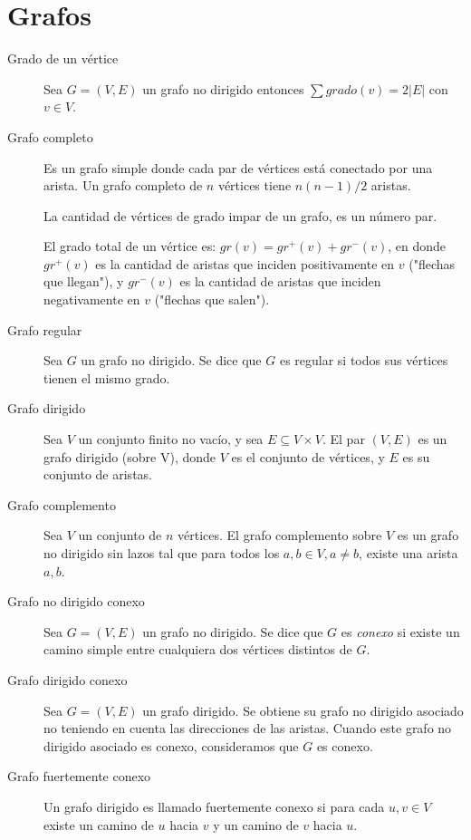 \section{Grafos}
\begin{description}
	\item[Grado de un vértice] Sea $G = (V,E)$ un grafo no dirigido entonces $\sum grado(v) = 2 |E|$ con $v \in V$.
	
	\item[Grafo completo] Es un grafo simple donde cada par de vértices está conectado por una arista. Un grafo completo de $n$ vértices tiene $n(n-1)/2$ aristas. 
	
	La cantidad de vértices de grado impar de un grafo, es un número par.
	
	El grado total de un vértice es: $gr(v) = gr^{+}(v) + gr^{-}(v) $, en donde
	$gr^{+}(v)$ es la cantidad de aristas que inciden positivamente en $v$ ("flechas que llegan"), y
	$gr^{-}(v)$ es la cantidad de aristas que inciden negativamente en $v$ ("flechas que salen").
	
	\item[Grafo regular] Sea $G$ un grafo no dirigido. Se dice que $G$ es regular si todos sus vértices tienen el mismo grado.
	
	\item[Grafo dirigido] Sea $V$ un conjunto finito no vacío, y sea $E \subseteq V \times V$. El par $(V,E)$ es un grafo dirigido (sobre V), donde $V$ es el conjunto de vértices, y $E$ es su conjunto de aristas.
	
	\item[Grafo complemento] Sea $V$ un conjunto de $n$ vértices. El grafo complemento sobre $V$ es un grafo no dirigido sin lazos tal que para todos los $a,b \in V, a \neq b$, existe una arista ${a,b}$.
	
	\item[Grafo no dirigido conexo] Sea $G = (V,E)$ un grafo no dirigido. Se dice que $G$ es \emph{conexo} si existe un camino simple entre cualquiera dos vértices distintos de $G$.
	
	\item[Grafo dirigido conexo] Sea $G = (V,E)$ un grafo dirigido. Se obtiene su grafo no dirigido asociado no teniendo en cuenta las direcciones de las aristas. Cuando este grafo no dirigido asociado es conexo, consideramos que $G$ es conexo.
	
	\item[Grafo fuertemente conexo] Un grafo dirigido es llamado fuertemente conexo si para cada $u,v \in V$ existe un camino de $u$ hacia $v$ y un camino de $v$ hacia $u$.
	

\end{description}
